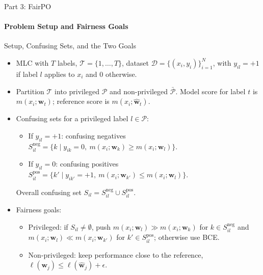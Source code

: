 \documentclass[aspectratio=169]{beamer}
\newcommand{\dataset}{\mathcal{D}}
\newcommand{\labels}{\mathcal{T}} %
\newcommand{\privileged}{\mathcal{P}} %
\newcommand{\nonprivileged}{\bar{\mathcal{P}}} %
\newcommand{\model}{m} %
\newcommand{\params}{\mathbf{w}} %
\newcommand{\refparams}{\hat{\mathbf{w}}} %
\newcommand{\baseloss}{\ell} %
\begin{document}
	\begin{frame}{Part 3: FairPO}
		\framesubtitle{Problem Setup and Fairness Goals}
		\begin{block}{\scriptsize Setup, Confusing Sets, and the Two Goals}\scriptsize
			\begin{itemize}
				\item MLC with $T$ labels, $\labels = \{1,\dots,T\}$, dataset $\dataset = \{(x_i, y_i)\}_{i=1}^N$, with $y_{il} = +1$ if label $l$ applies to $x_i$ and $0$ otherwise.
				\item Partition $\labels$ into privileged $\privileged$ and non-privileged $\nonprivileged$. Model score for label $t$ is $\model(x_i; \params_t)$; reference score is $\model(x_i; \refparams_t)$.
				\item Confusing sets for a privileged label $l \in \privileged$:
				\begin{itemize}\scriptsize
					\item If $y_{il} = +1$: confusing negatives $S_{il}^{\text{neg}} = \{ k \mid y_{ik} = 0,\ \model(x_i; \params_k) \ge \model(x_i; \params_l) \}$.
					\item If $y_{il} = 0$: confusing positives $S_{il}^{\text{pos}} = \{ k' \mid y_{ik'} = +1,\ \model(x_i; \params_{k'}) \le \model(x_i; \params_l) \}$.
				\end{itemize}
				Overall confusing set $S_{il} = S_{il}^{\text{neg}} \cup S_{il}^{\text{pos}}$.
				\item Fairness goals:
				\begin{itemize}\scriptsize
					\item Privileged: if $S_{il} \neq \emptyset$, push $\model(x_i; \params_l) \gg \model(x_i; \params_k)$ for $k \in S_{il}^{\text{neg}}$ and $\model(x_i; \params_l) \ll \model(x_i; \params_{k'})$ for $k' \in S_{il}^{\text{pos}}$; otherwise use BCE.
					\item Non-privileged: keep performance close to the reference, $\baseloss(\params_j) \le \baseloss(\refparams_j) + \epsilon$.
				\end{itemize}
			\end{itemize}
		\end{block}
	\end{frame}
	
\end{document}
